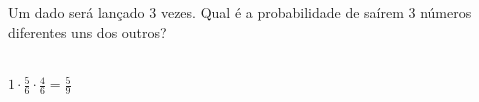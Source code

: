 \begin{ex}
Um dado será lançado 3 vezes. Qual é a probabilidade de saírem 3 números diferentes uns dos outros?
  \begin{sol}
   \phantom{A} \\
   $1\cdot\frac{5}{6}\cdot\frac{4}{6}=\frac{5}{9}$
  \end{sol}
\end{ex}